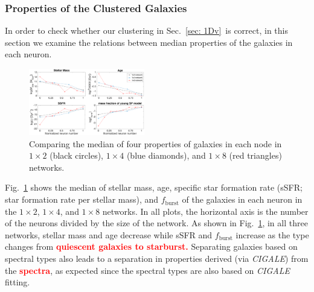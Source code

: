         
        \subsubsection{Properties of the Clustered Galaxies}
        
       In order to check whether our clustering in Sec.~\ref{sec: 1Dv}~is correct, in this section we examine the relations between median properties of the galaxies in each neuron. 
        
        \begin{figure}
            \centering
            \includegraphics[width=0.45\textwidth]{images0.01/1d/props5.png}
            \caption[The median of four properties of galaxies in three networks]{Comparing the median of four properties of galaxies in each node in $1\times2$ (black circles), $1\times4$ (blue diamonds), and $1\times8$ (red triangles) networks.}
            \label{fig: props}
        \end{figure}
       
        Fig.~\ref{fig: props} shows the median of stellar mass, age, specific star formation rate (sSFR; star formation rate per stellar mass), and $f_\mathrm{burst}$ of the galaxies in each neuron in the $1\times2$, $1\times4$, and $1\times8$ networks.
        In all plots, the horizontal axis is the number of the neurons divided by the size of the network.
        As shown in Fig.~\ref{fig: props}, in all three networks, stellar mass and age decrease while sSFR and $f_\mathrm{burst}$ increase as the type changes from \textbf{\textcolor{red}{quiescent galaxies to starburst.}}
       Separating galaxies based on spectral types also leads to a separation in properties derived (via {\em CIGALE}) from the \textbf{\textcolor{red}{spectra}}, as expected since the spectral types are also based on {\em CIGALE} fitting. 
    

